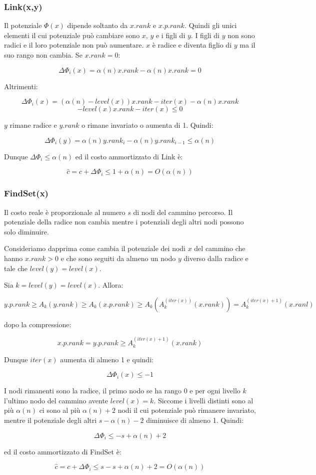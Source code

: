 \subsubsection{Link(x,y)}

Il potenziale $\Phi(x)$ dipende soltanto da $x.rank$ e $x.p.rank$. Quindi gli unici elementi il cui potenziale può cambiare sono $x$, $y$ e i figli di $y$. I figli di $y$ non sono radici e il loro potenziale non può aumentare. $x$ è radice e diventa figlio di $y$ ma il suo rango non cambia. Se $x.rank=0$:

$$\Delta\Phi_i(x)=\alpha(n)x.rank-\alpha(n)x.rank=0$$

Altrimenti:

$$\Delta\Phi_i(x)=(\alpha(n)-level(x))x.rank-iter(x)-\alpha(n)x.rank$$
$$-level(x)x.rank-iter(x)\le 0$$

$y$ rimane radice e $y.rank$ o rimane invariato o aumenta di 1. Quindi:

$$\Delta\Phi_i(y)=\alpha(n)y.rank_i-\alpha(n)y.rank_{i-1}\le \alpha(n)$$

Dunque $\Delta\Phi_i\le\alpha(n)$ ed il costo ammortizzato di Link è:

$$\hat{c}=c+\Delta\Phi_i\le 1 +\alpha(n)=O(\alpha(n))$$

\subsubsection{FindSet(x)} 

Il costo reale è proporzionale al numero $s$ di nodi del cammino percorso. Il potenziale della radice non cambia mentre i potenziali degli altri nodi possono solo diminuire.

Consideriamo dapprima come cambia il potenziale dei nodi $x$ del cammino che hanno $x.rank>0$ e che sono seguiti da almeno un nodo $y$ diverso dalla radice e tale che $level(y)=level(x)$.

Sia $k=level(y)=level(x)$. Allora:

$$y.p.rank\ge A_k(y.rank)\ge A_k(x.p.rank)\ge A_k(A_k^{(iter(x))}(x.rank))=A_k^{(iter(x)+1)}(x.ranl)$$

dopo la compressione:

$$x.p.rank=y.p.rank\ge A_k^{(iter(x)+1)}(x.rank)$$

Dunque $iter(x)$ aumenta di almeno 1 e quindi:

$$\Delta\Phi_i(x)\le-1$$

I nodi rimanenti sono la radice, il primo nodo se ha rango 0 e per ogni livello $k$ l'ultimo nodo del cammino avente $level(x)=k$. Siccome i livelli distinti sono al più $\alpha(n)$ ci sono al più $\alpha(n)+2$ nodi il cui potenziale può rimanere invariato, mentre il potenziale degli altri $s-\alpha(n)-2$ diminuisce di almeno 1. Quindi:

$$\Delta\Phi_i\le-s+\alpha(n)+2$$

ed il costo ammortizzato di FindSet è:

$$\hat{c}=c+\Delta\Phi_i\le s-s+\alpha(n)+2=O(\alpha(n))$$

